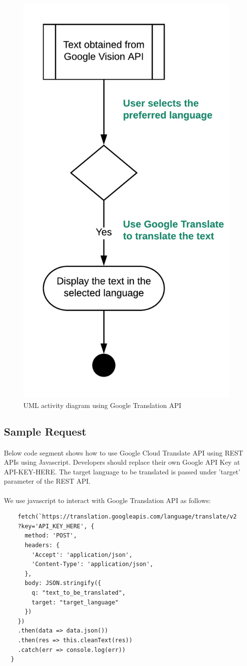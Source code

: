 \documentclass[12pt]{article}
\begin{document}
\begin{figure}[H]
	\centering
	\includegraphics[width=0.5\linewidth]{media/Translate.png}
	\caption{UML activity diagram using Google Translation API}
	\label{fig:translate_uml}
\end{figure} 

\subsection{Sample Request}

\paragraph{}Below code segment shows how to use Google Cloud Translate API using REST APIs using Javascript. Developers should replace their own Google API Key at  API-KEY-HERE. The target language to be translated is passed under 'target' parameter of the REST API. 

\paragraph{}We use javascript to interact with Google Translation API as follows:

\begin{lstlisting}
    fetch(`https://translation.googleapis.com/language/translate/v2
    ?key='API_KEY_HERE', {
      method: 'POST',
      headers: {
        'Accept': 'application/json',
        'Content-Type': 'application/json',
      },
      body: JSON.stringify({
        q: "text_to_be_translated",
        target: "target_language"
      })
    })
    .then(data => data.json())
    .then(res => this.cleanText(res))
    .catch(err => console.log(err))
  }
\end{lstlisting}
\end{document}
